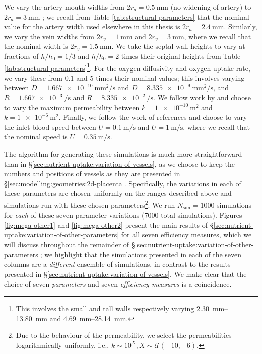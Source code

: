         We vary the artery mouth widths from $2r_a = \qty{0.5}{\milli\metre}$ (no widening of artery) to $2r_a = \qty{3}{\milli\metre}$ \cite{burtonRheologicalPhysiologicalConsequences2009}; we recall from Table \ref{tab:structural-parameters} that the nominal value for the artery width used elsewhere in this thesis is $2r_a = \qty{2.4}{\milli\metre}$. Similarly, we vary the vein widths from $2r_v = \qty{1}{\milli\metre}$ and $2r_v = \qty{3}{\milli\metre}$, where we recall that the nominal width is $2r_v = \qty{1.5}{\milli\metre}$. We take the septal wall heights to vary at fractions of $h/h_0 = 1/3$ and $h/h_0 = 2$ times their original heights from Table \ref{tab:structural-parameters}\footnote{This involves the small and tall walls respectively varying \qtyrange{2.30}{13.80}{\milli\metre} and \qtyrange{4.69}{28.14}{\milli\metre}.}. For the oxygen diffusivity and oxygen uptake rate, we vary these from $0.1$ and $5$ times their nominal values; this involves varying between $D = \qty{1.667e-10}{\milli\metre^2\per\second}$ and $D = \qty{8.335e-9}{\milli\metre^2\per\second}$, and $R = \qty{1.667e-3}{\per\second}$ and $R = \qty{8.335e-2}{\per\second}$. We follow work by \citeauthor{lecarpentierComputationalFluidDynamic2016} \cite{lecarpentierComputationalFluidDynamic2016} and choose to vary the maximum permeability between $k = \qty{1e-10}{\metre^2}$ and $k = \qty{1e-6}{\metre^2}$. Finally, we follow the work of references \cite{burtonRheologicalPhysiologicalConsequences2009,saghianAssociationPlacentalJets2017,chernyavskyMathematicalModelIntervillous2010} and choose to vary the inlet blood speed between $U = \qty{0.1}{\metre\per\second}$ and $U = \qty{1}{\metre\per\second}$, where we recall that the nominal speed is $U = \qty{0.35}{\metre\per\second}$.
        
        The algorithm for generating these simulations is much more straightforward than in \S\ref{sec:nutrient-uptake:variation-of-vessels}, as we choose to keep the numbers and positions of vessels as they are presented in \S\ref{sec:modelling:geometries:2d-placenta}. Specifically, the variations in each of these parameters are chosen uniformly on the ranges described above and simulations run with these chosen parameters\footnote{Due to the behaviour of the permeability, we select the permeabilities logarithmically uniformly, i.e., $k \sim 10^{X}, X \sim \mathcal{U}(-10, -6)$.}. We run $N_\text{sim} = 1000$ simulations for \textit{each} of these seven parameter variations ($7000$ total simulations). Figures \ref{fig:mega-other1} and \ref{fig:mega-other2} present the main results of \S\ref{sec:nutrient-uptake:variation-of-other-parameters} for all seven efficiency measures, which we will discuss throughout the remainder of \S\ref{sec:nutrient-uptake:variation-of-other-parameters}; we highlight that the simulations presented in each of the seven columns are a \textit{different} ensemble of simulations, in contrast to the results presented in \S\ref{sec:nutrient-uptake:variation-of-vessels}. We make clear that the choice of seven \textit{parameters} and seven \textit{efficiency measures} is a coincidence.

